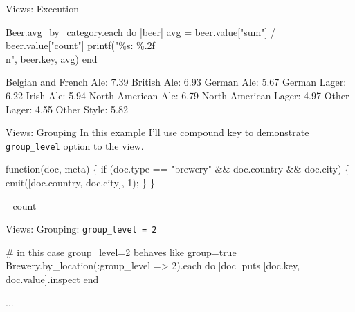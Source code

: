 \documentclass[aspectratio=43]{beamer}
\begin{document}
\begin{frame}[fragile]{Views: Execution}
  \begin{semiverbatim}
  Beer.avg_by_category.each do |beer|
    avg = beer.value["sum"] / beer.value["count"]
    printf("\alert<3>{\%s}: \alert<4>{\%.2f}\\n", \alert<3>{beer.key}, \alert<4>{avg})
  end
  \end{semiverbatim}

  \pause
  \begin{semiverbatim}
  \alert<3>{Belgian and French Ale}: \alert<4>{7.39}
  \alert<3>{British Ale}: \alert<4>{6.93}
  \alert<3>{German Ale}: \alert<4>{5.67}
  \alert<3>{German Lager}: \alert<4>{6.22}
  \alert<3>{Irish Ale}: \alert<4>{5.94}
  \alert<3>{North American Ale}: \alert<4>{6.79}
  \alert<3>{North American Lager}: \alert<4>{4.97}
  \alert<3>{Other Lager}: \alert<4>{4.55}
  \alert<3>{Other Style}: \alert<4>{5.82}
  \end{semiverbatim}
\end{frame}

\begin{frame}[fragile]{Views: Grouping}
  In this example I'll use compound key to demonstrate
  \texttt{group\_level} option to the view.

  \begin{semiverbatim}
  \pause
  function(doc, meta) \{
    if (doc.type == "brewery" \&\& doc.country \&\& doc.city) \{
      emit(\alert<2>{[doc.country, doc.city]}, 1);
    \}
  \}
  \pause

  \_count
  \end{semiverbatim}
\end{frame}

\begin{frame}[fragile]{Views: Grouping: \texttt{group\_level = 2}}
  \begin{semiverbatim}
  # in this case group_level=2 behaves like group=true
  Brewery.by_location(\alert<3>{:group_level => 2}).each do |doc|
    puts [\alert<3>{doc.key}, doc.value].inspect
  end
  \end{semiverbatim}

  \pause

  \begin{semiverbatim}
  ...
  \end{semiverbatim}
\end{frame}
\end{document}
